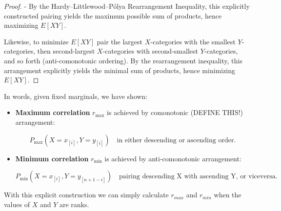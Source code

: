 \documentclass[
  12pt,
]{article}
\begin{document}
\begin{proof}
- By the Hardy–Littlewood–Pólya Rearrangement Inequality, this explicitly constructed pairing yields the maximum possible sum of products, hence maximizing $E[XY]$.
    

Likewise, to minimize $E[XY]$ pair the largest $X$-categories with the smallest $Y$-categories, then second-largest $X$-categories with second-smallest $Y$-categories, and so forth (anti-comonotonic ordering).   By the rearrangement inequality, this arrangement explicitly yields the minimal sum of products, hence minimizing $E[XY]$.
    


\end{proof}

In words, given fixed marginals, we have shown:

\begin{itemize}
\item
  \textbf{Maximum correlation} \(r_{\text{max}}\) is achieved by
  comonotonic (DEFINE THIS!) arrangement:

  \[P_{\text{max}}(X=x_{[i]}, Y=y_{[i]}) \quad\text{in either descending or ascending order.}\]
\item
  \textbf{Minimum correlation} \(r_{\text{min}}\) is achieved by
  anti-comonotonic arrangement:

  \[P_{\text{min}}(X=x_{[i]}, Y=y_{[n+1-i]}) \quad\text{pairing descending X with ascending Y, or viceversa.}\]
\end{itemize}

With this explicit construction we can simply calculate \(r_{max}\) and
\(r_{min}\) when the values of \(X\) and \(Y\) are ranks.
\end{document}
